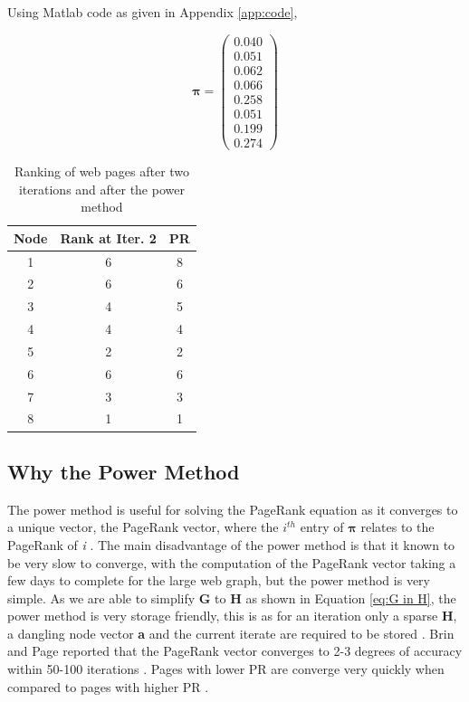 \documentclass[11pt]{report}
\begin{document}
Using Matlab code as given in Appendix \ref{app:code}, 

\[\boldsymbol\pi = \left(
\begin{array}{c}
0.040 \\
0.051 \\
0.062 \\
0.066 \\
0.258 \\
0.051 \\
0.199 \\
0.274
\end{array}
\right)\]

\begin{table}[H] \caption{Ranking of web pages after two iterations and after the power method}
 \centering
 \begin{tabular} {c| c c} 
 Node & Rank at Iter. 2 & PR \\ [0.5ex] 
 \hline
 1&6&8\\
 2&6&6\\
 3&4&5\\
 4&4&4\\
 5&2&2\\
 6&6&6\\
 7&3&3\\
 8&1&1\\
 \end{tabular}
 \label{Table:PR and summ}
\end{table}

\subsection{Why the Power Method}\label{sec:why power}

The power method is useful for solving the PageRank equation as it converges to a unique vector, the PageRank vector, where the $i^{th}$ entry of $\boldsymbol\pi$ relates to the PageRank of \textit{i} \cite{ipsen2005analysis}. The main disadvantage of the power method is that it known to be very slow to converge, with the computation of the PageRank vector taking a few days to complete for the large web graph, but the power method is very simple. As we are able to simplify \textbf{G} to \textbf{H} as shown in Equation \eqref{eq:G in H}, the power method is very storage friendly, this is as for an iteration only a sparse \textbf{H}, a dangling node vector \textbf{a} and the current iterate are required to be stored \cite{langville}. Brin and Page reported that the PageRank vector converges to 2-3 degrees of accuracy within 50-100 iterations \cite{austin}. Pages with lower PR are converge very quickly when compared to pages with higher PR \cite{thorson2004modeling}.
\end{document}

